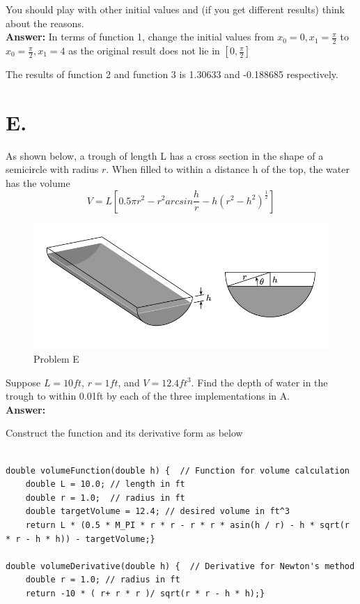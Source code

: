 \documentclass{article}
\begin{document}
\begin{CJK}{UTF8}{gbsn}
You should play with other initial values and (if you get different results) think about the reasons.\\


\textbf{Answer: }
In terms of function 1, change the initial values from $x_0 = 0, x_1 = \frac{\pi}{2}$ to $x_0 = \frac{\pi}{2}, x_1 = 4$ as the original result does not lie in $[0,\frac{\pi}{2}]$

The results of function 2 and function 3 is 1.30633 and -0.188685 respectively.

\section*{E.}
As shown below, a trough of length L has a cross section in the shape of a semicircle with radius $r$. When filled to within a distance h of the top, the water has the volume
$$
V=L\left[0.5πr^2 - r^2 arcsin\frac{h}{r} - h(r^2 - h^2)^{\frac{1}{2}}\right]
$$
\begin{figure}[h]
    \centering
    \includegraphics[width=0.5\linewidth]{E.png}
    \caption{Problem E}
    \label{Problem E}
\end{figure}


Suppose $L = 10ft$, $r = 1ft$, and $V = 12.4ft^3$. Find the depth of water in the trough to within 0.01ft by each of the three implementations in A.\\


\textbf{Answer: }

Construct the function and its derivative form as below
\begin{verbatim}
    
double volumeFunction(double h) {  // Function for volume calculation
    double L = 10.0; // length in ft
    double r = 1.0;  // radius in ft
    double targetVolume = 12.4; // desired volume in ft^3
    return L * (0.5 * M_PI * r * r - r * r * asin(h / r) - h * sqrt(r * r - h * h)) - targetVolume;}

double volumeDerivative(double h) {  // Derivative for Newton's method
    double r = 1.0; // radius in ft
    return -10 * ( r+ r * r )/ sqrt(r * r - h * h);}
\end{verbatim}


\end{CJK}
\end{document}
